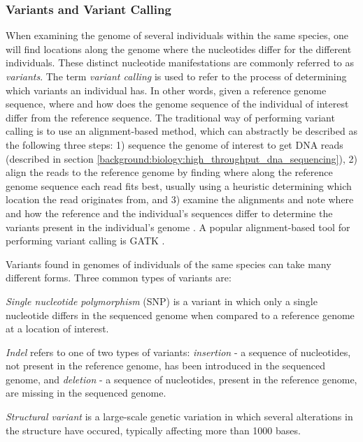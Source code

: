 \subsubsection{Variants and Variant Calling} \label{background:biology:variants_and_variant_calling}
When examining the genome of several individuals within the same species, one will find locations along the genome where the nucleotides differ for the different individuals.
These distinct nucleotide manifestations are commonly referred to as \textit{variants}.
The term \textit{variant calling} is used to refer to the process of determining which variants an individual has.
In other words, given a reference genome sequence, where and how does the genome sequence of the individual of interest differ from the reference sequence.
The traditional way of performing variant calling is to use an alignment-based method, which can abstractly be described as the following three steps:
1) sequence the genome of interest to get DNA reads (described in section \ref{background:biology:high_throughput_dna_sequencing}), 
2) align the reads to the reference genome by finding where along the reference genome sequence each read fits best, usually using a heuristic determining which location the read originates from, and 
3) examine the alignments and note where and how the reference and the individual's sequences differ to determine the variants present in the individual's genome \cite{variant_calling}.
A popular alignment-based tool for performing variant calling is GATK \cite{gatk}.

Variants found in genomes of individuals of the same species can take many different forms.
Three common types of variants are:
\begin{compactitem}
  \item \textit{Single nucleotide polymorphism} (SNP) is a variant in which only a single nucleotide differs in the sequenced genome when compared to a reference genome at a location of interest.
  \item \textit{Indel} refers to one of two types of variants: \textit{insertion} - a sequence of nucleotides, not present in the reference genome, has been introduced in the sequenced genome, and \textit{deletion} - a sequence of nucleotides, present in the reference genome, are missing in the sequenced genome.
  \item \textit{Structural variant} is a large-scale genetic variation in which several alterations in the structure have occured, typically affecting more than 1000 bases.
\end{compactitem}


